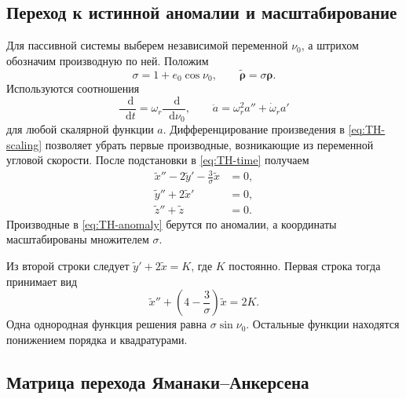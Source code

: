 \documentclass[a4paper,11pt]{article}
\newcommand{\dd}{\mathop{}\!\mathrm d}
\numberwithin{equation}{section}
\theoremstyle{remark}
\newcommand{\vect}[1]{\boldsymbol{#1}}
\begin{document}
\subsection{Переход к истинной аномалии и масштабирование}

Для пассивной системы выберем независимой переменной
$\nu_0$, а штрихом обозначим производную по ней.
Положим
\begin{equation}
 \sigma=1+e_0\cos\nu_0,\qquad
 \widetilde{\vect\rho}=\sigma\vect\rho.
 \label{eq:TH-scaling}
\end{equation}
Используются соотношения
\[
 \frac{\dd}{\dd t}=\omega_r\frac{\dd}{\dd\nu_0},\qquad
 \ddot a=\omega_r^2a''+\dot\omega_r a'
\]
для любой скалярной функции $a$.
Дифференцирование произведения в \eqref{eq:TH-scaling}
позволяет убрать первые производные, возникающие
из переменной угловой скорости.
После подстановки в \eqref{eq:TH-time} получаем
\begin{equation}
 \begin{aligned}
  \widetilde x''-2\widetilde y'
                    -\frac{3}{\sigma}\widetilde x&=0,\\
  \widetilde y''+2\widetilde x'&=0,\\
  \widetilde z''+\widetilde z&=0.
 \end{aligned}
 \label{eq:TH-anomaly}
\end{equation}
Производные в \eqref{eq:TH-anomaly} берутся по аномалии,
а координаты масштабированы множителем $\sigma$.

Из второй строки следует
$\widetilde y'+2\widetilde x=K$, где $K$ постоянно.
Первая строка тогда принимает вид
\begin{equation}
 \widetilde x''+
     \left(4-\frac3\sigma\right)\widetilde x=2K.
 \label{eq:TH-scalar-radial}
\end{equation}
Одна однородная функция решения равна
$\sigma\sin\nu_0$. Остальные функции находятся понижением порядка и квадратурами.

\subsection{Матрица перехода Яманаки--Анкерсена}
\end{document}
